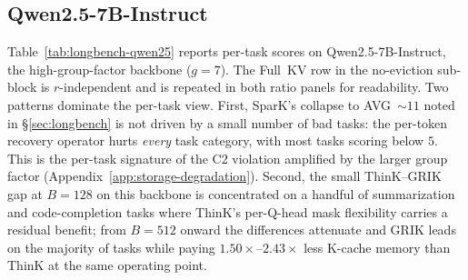 \documentclass{article}
\begin{document}
\subsection{Qwen2.5-7B-Instruct}
 
Table~\ref{tab:longbench-qwen25} reports per-task scores on Qwen2.5-7B-Instruct, the high-group-factor backbone ($g{=}7$). The Full~KV row in the no-eviction sub-block is $r$-independent and is repeated in both ratio panels for readability. Two patterns dominate the per-task view. First, SparK's collapse to AVG~$\sim 11$ noted in \S\ref{sec:longbench} is not driven by a small number of bad tasks: the per-token recovery operator hurts \emph{every} task category, with most tasks scoring below $5$. This is the per-task signature of the C2 violation amplified by the larger group factor (Appendix~\ref{app:storage-degradation}). Second, the small ThinK--GRIK gap at $B{=}128$ on this backbone is concentrated on a handful of summarization and code-completion tasks where ThinK's per-Q-head mask flexibility carries a residual benefit; from $B{=}512$ onward the differences attenuate and GRIK leads on the majority of tasks while paying $1.50\times$--$2.43\times$ less K-cache memory than ThinK at the same operating point.
 
\end{document}
